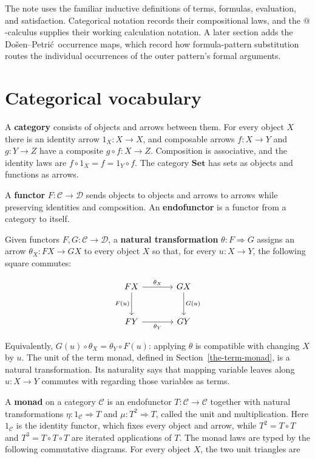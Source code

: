 \documentclass[11pt]{article}
\makeatletter
\newcommand{\atsign}{\mathord{@}}
\newcommand{\DP}{Do\v{s}en--Petri\'{c}}
\theoremstyle{definition}
\makeatother
\begin{document}
The note uses the familiar inductive definitions of terms, formulas,
evaluation, and satisfaction. Categorical notation records their compositional
laws, and the $\atsign$-calculus supplies their working calculation notation.
A later section adds the \DP\ occurrence maps, which record how
formula-pattern substitution routes the individual occurrences of the outer
pattern's formal arguments.

\section{Categorical vocabulary}\label{categorical-vocabulary}

A \textbf{category} consists of objects and arrows between them. For every
object \(X\) there is an identity arrow \(1_X:X\to X\), and composable arrows
\(f:X\to Y\) and \(g:Y\to Z\) have a composite
\(g\circ f:X\to Z\). Composition is associative, and the identity laws are
\(f\circ1_X=f=1_Y\circ f\). The category \(\mathbf{Set}\) has sets as objects
and functions as arrows.

A \textbf{functor} \(F:\mathcal C\to\mathcal D\) sends objects to
objects and arrows to arrows while preserving identities and
composition. An \textbf{endofunctor} is a functor from a category to
itself.

Given functors \(F,G:\mathcal C\to\mathcal D\), a \textbf{natural
transformation} \(\theta:F\Rightarrow G\) assigns an arrow
\(\theta_X:FX\to GX\) to every object \(X\) so that, for every
\(u:X\to Y\), the following square commutes:

\[
\begin{tikzcd}[row sep=large,column sep=large]
F X \arrow[r,"\theta_X"] \arrow[d,"F(u)"'] &
G X \arrow[d,"G(u)"] \\
F Y \arrow[r,"\theta_Y"'] &
G Y
\end{tikzcd}
\]

Equivalently, \(G(u)\circ\theta_X=\theta_Y\circ F(u)\): applying
\(\theta\) is compatible with changing \(X\) by \(u\). The unit of the term
monad, defined in Section~\ref{the-term-monad}, is a natural transformation.
Its naturality says that mapping variable leaves along \(u:X\to Y\) commutes
with regarding those variables as terms.

A \textbf{monad} on a category \(\mathcal C\) is an endofunctor
\(T:\mathcal C\to\mathcal C\) together with natural transformations
\(\eta:1_{\mathcal C}\Rightarrow T\) and \(\mu:T^2\Rightarrow T\), called
the unit and multiplication. Here \(1_{\mathcal C}\) is the identity functor,
which fixes every object and arrow, while \(T^2=T\circ T\) and
\(T^3=T\circ T\circ T\) are iterated applications of \(T\). The monad laws
are typed by the following commutative diagrams. For every object \(X\), the
two unit triangles are
\end{document}
